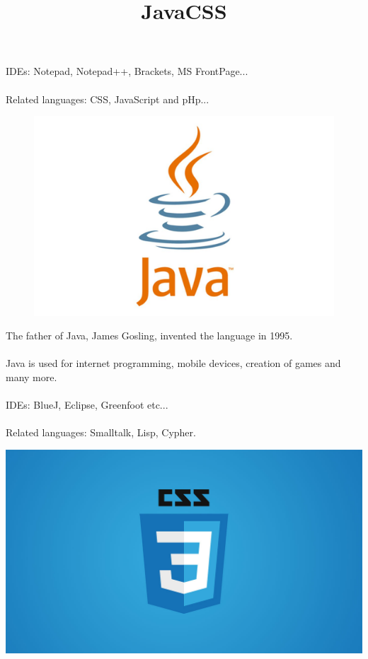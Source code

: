 \documentclass{article}
\begin{document}
	\paragraph{}
	IDEs: Notepad, Notepad++, Brackets, MS FrontPage...
	\paragraph{}
	Related languages: CSS, JavaScript and pHp...
	\newpage
	\title{Java}
	\begin{figure}
		\includegraphics[width=\linewidth]{java.jpg}
	\end{figure}
	
	\newpage
	The father of Java, James Gosling, invented the language in 1995.
	\paragraph{}
	Java is used for internet programming, mobile devices, creation of games and many more.
	\paragraph{}
	IDEs: BlueJ, Eclipse, Greenfoot etc...
	\paragraph{}
	Related languages: Smalltalk, Lisp, Cypher.
	
	\newpage
	\title{CSS}
	\includegraphics[width=\linewidth]{CSS.jpg}	
	
	
\end{document}
